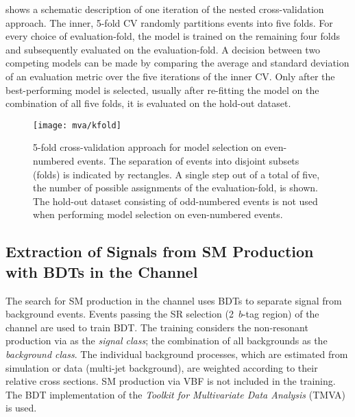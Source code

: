  shows a schematic description of one
iteration of the nested cross-validation approach. The inner, 5-fold
CV randomly partitions events into five folds. For every choice of
evaluation-fold, the model is trained on the remaining four folds and
subsequently evaluated on the evaluation-fold. A decision between two
competing models can be made by comparing the average and standard
deviation of an evaluation metric over the five iterations of the inner
CV. Only after the best-performing model is selected, usually after
re-fitting the model on the combination of all five folds, it is
evaluated on the hold-out dataset.

\begin{figure}[htbp]
  \centering

  \texttt{[image: mva/kfold]}

  \caption[5-fold cross-validation approach for model selection.]{5-fold
    cross-validation approach for model selection on even-numbered events. The
    separation of events into disjoint subsets (folds) is indicated by
    rectangles. A single step out of a total of five, the number of possible
    assignments of the evaluation-fold, is shown. The hold-out dataset
    consisting of odd-numbered events is not used when performing model
    selection on even-numbered events.}%
  \label{fig:cross_validation}
\end{figure}



\subsection{Extraction of Signals from SM \HH Production with BDTs in
  the \hadhad Channel}%
\label{sec:mva_smbdt}

The search for SM \HH production in the \hadhad channel uses BDTs to
separate signal from background events. Events passing the SR
selection (2~$b$-tag region) of the \hadhad channel are used to
train BDT. The training considers the non-resonant \HH production via
\ggF as the \emph{signal class}; the combination of all backgrounds as
the \emph{background class}. The individual background processes,
which are estimated from simulation or data (multi-jet background),
are weighted according to their relative cross sections. SM \HH
production via VBF is not included in the training.
The BDT implementation of the \emph{Toolkit for Multivariate Data
  Analysis} (TMVA)~\cite{TMVA} is used.


